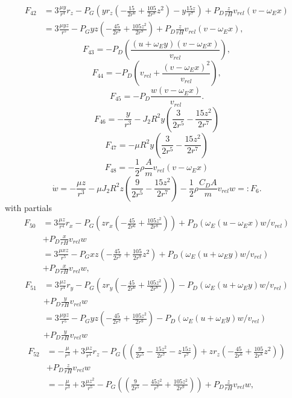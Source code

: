 \documentclass[]{article}
\begin{document}
\begin{eqnarray}
F_{42} & =  3 \frac{\mu y}{r^4} r_z - P_G  \left( y r_z \left( -\frac{15}{2 r^6} + \frac{105}{2r^8}z^2 \right) - y\frac{15 z}{r^7} \right) +  P_D \frac{z}{r H} v_{rel} (v-\omega_E x)  \\
& =  3 \frac{\mu y z}{r^5} - P_G  y z \left( -\frac{45}{2 r^7} + \frac{105z^2}{2r^9}  \right) +  P_D \frac{z}{r H} v_{rel} (v-\omega_E x),
\end{eqnarray}
$$
F_{43} = -P_D \left(  \frac{(u+\omega_E y)(v-\omega_E x)}{v_{rel}} \right),
$$
$$
F_{44} = -P_D \left( v_{rel} + \frac{(v-\omega_E x)^2}{v_{rel}} \right),
$$
$$
F_{45} = -P_D \frac{w (v-\omega_E x)}{v_{rel}}.
$$
$$
F_{46} = -\frac{y}{r^3} - J_2 R^2  y \left( \frac{3}{2r^5} - \frac{15z^2}{2r^7} \right) 
$$
$$
F_{47} = - \mu R^2  y \left( \frac{3}{2r^5} - \frac{15z^2}{2r^7} \right) 
$$
$$
F_{48} = - \frac{1}{2} \rho \frac{A}{m} v_{rel} (v-\omega_E x)
$$
\newpage
$$
\dot{w} =  -\frac{\mu z}{r^3} - \mu J_2 R^2 z  \left( \frac{9}{2r^5} - \frac{15z^2}{2r^7} \right) - \frac{1}{2} \rho \frac{C_D A}{m} v_{rel} w =: F_6.
$$
with partials
\begin{eqnarray}
F_{50} & =  3 \frac{\mu z}{r^4} r_x - P_G \left( z r_x \left( -\frac{45}{2 r^6} + \frac{105 z^2}{2r^8} \right) \right) + P_D \left(  \omega_E (u-\omega_E x) w /v_{rel} \right)\\
& +  P_D \frac{x}{r H} v_{rel} w\\
& =  3 \frac{\mu x z}{r^5} - P_G  x z \left( -\frac{45}{2 r^7} + \frac{105}{2r^9}z^2  \right) + P_D \left(  \omega_E (u+\omega_E y) w /v_{rel} \right)  \\
& +  P_D \frac{x}{r H} v_{rel} w,
\end{eqnarray}
\begin{eqnarray}
F_{51} & =  3 \frac{\mu z}{r^4} r_y - P_G  \left( z r_y \left( -\frac{45}{2 r^6} + \frac{105z^2}{2r^8} \right) \right) - P_D \left(  \omega_E (u+\omega_E y) w /v_{rel} \right) \\
& +  P_D \frac{y}{r H} v_{rel} w \\
& =  3 \frac{\mu y z}{r^5} - P_G  y z \left( -\frac{45}{2 r^7} + \frac{105z^2}{2r^9}  \right) - P_D \left(  \omega_E (u+\omega_E y) w /v_{rel} \right) \\
& + P_D \frac{y}{r H} v_{rel} w 
\end{eqnarray}
\begin{eqnarray}
F_{52} & = -\frac{\mu}{r^3} + 3 \frac{\mu z}{r^4} r_z - P_G \left( \left( \frac{9}{2r^5} - \frac{15z^2}{2r^7} - z\frac{15 z}{r^7} \right) + z r_z \left( -\frac{45}{2 r^6} + \frac{105}{2r^8}z^2 \right) \right) \\
& + P_D \frac{z}{r H} v_{rel} w \\
& = -\frac{\mu}{r^3} + 3 \frac{\mu z^2}{r^5}  - P_G \left( \left( \frac{9}{2r^5} - \frac{45z^2}{r^7} + \frac{105z^2}{2r^9} \right) \right)  + P_D \frac{z}{r H} v_{rel} w,
\end{eqnarray}
\end{document}
